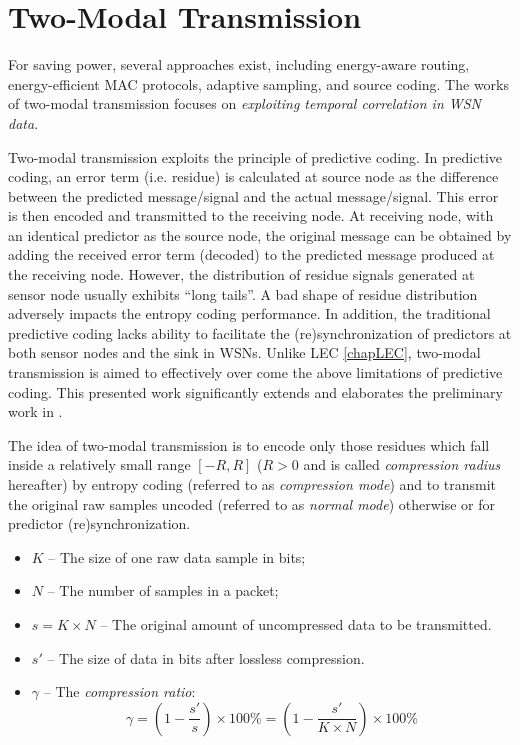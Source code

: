 \chapter{Two-Modal Transmission}

For saving power, several approaches exist, including \textcolor[rgb]{1,0,0}{energy-aware routing}, \textcolor[rgb]{1,0,0}{energy-efficient MAC protocols}, \textcolor[rgb]{1,0,0}{adaptive sampling}, and \textcolor[rgb]{1,0,0}{source coding}. The works of two-modal transmission focuses on \emph{\textcolor[rgb]{1,0,0}{exploiting temporal correlation in WSN data}}.

Two-modal transmission exploits the principle of predictive coding. In predictive coding, an error term (i.e. residue) is calculated at source node as the \textcolor[rgb]{1,0,0}{difference between the predicted message/signal and the actual message/signal}. This error is then encoded and transmitted to the receiving node. At receiving node, with an identical predictor as the source node, the original message can be obtained by adding the received error term (decoded) to the predicted message produced at the receiving node. However, the distribution of residue signals generated at sensor node usually \textcolor[rgb]{0,0,1}{exhibits ``long tails''}. A bad shape of residue distribution adversely \textcolor[rgb]{0,0,1}{impacts the entropy coding performance}. In addition, the traditional predictive coding lacks ability to facilitate the (re)synchronization of predictors at \textcolor[rgb]{0,0,1}{both sensor nodes and the sink} in WSNs. Unlike LEC \cref{chapLEC}, two-modal transmission is aimed to effectively over come the above limitations of predictive coding. This presented work significantly extends and elaborates the preliminary work in \cite{Huang2007}. 

The idea of two-modal transmission is to encode only those residues which \textcolor[rgb]{1,0,0}{fall inside a relatively small range $[-R,R]$ ($R>0$ and is called \emph{compression radius} hereafter)} by entropy coding (referred to as \emph{compression mode}) and to transmit the original raw samples uncoded (referred to as \emph{normal mode}) otherwise or for predictor (re)synchronization.

\begin{itemize}
    \item $K$ -- The size of one raw data sample in bits;
    \item $N$ -- The number of samples in a packet;
    \item $s=K\times N$ -- The original amount of uncompressed data to be transmitted.
    \item $s'$ -- The size of data in bits after lossless compression.
    \item $\gamma$ -- The \emph{compression ratio}:
        \begin{equation}
            \gamma = (1-\dfrac{s'}{s}) \times 100\% = (1- \dfrac{s'}{K\times N})\times 100 \%
            \label{eq2.1}
        \end{equation}
\end{itemize}

